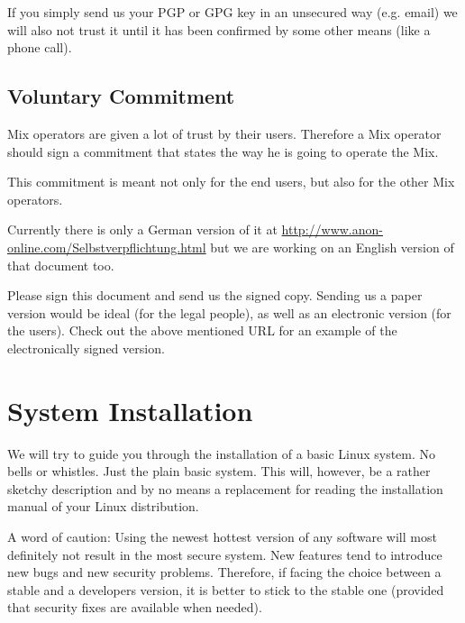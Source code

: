 \documentclass{article}
\begin{document}
If you simply send us your PGP or GPG key in an unsecured way (e.g.
email) we will also not trust it until it has been confirmed by some
other means (like a phone call).


\subsection{Voluntary Commitment}

Mix operators are given a lot of trust by their users. Therefore a Mix
operator should sign a commitment that states the way he is going to
operate the Mix.

This commitment is meant not only for the end users, but also for the
other Mix operators.

Currently there is only a German version of it at
\url{http://www.anon-online.com/Selbstverpflichtung.html} but we are
working on an English version of that document too.

Please sign this document and send us the signed copy. Sending us a paper
version would be ideal (for the legal people), as well as an
electronic version (for the users). Check out the above mentioned URL
for an example of the electronically signed version.


\section{System Installation}
\label{sys_install}

We will try to guide you through the installation of a basic Linux
system. No bells or whistles. Just the plain basic system. This will,
however, be a rather sketchy description and by no means a replacement
for reading the installation manual of your Linux distribution.

A word of caution: Using the newest hottest version of any software
will most definitely not result in the most secure system. New
features tend to introduce new bugs and new security problems.
Therefore, if facing the choice between a stable and a developers
version, it is better to stick to the stable one (provided that
security fixes are available when needed).

\end{document}
